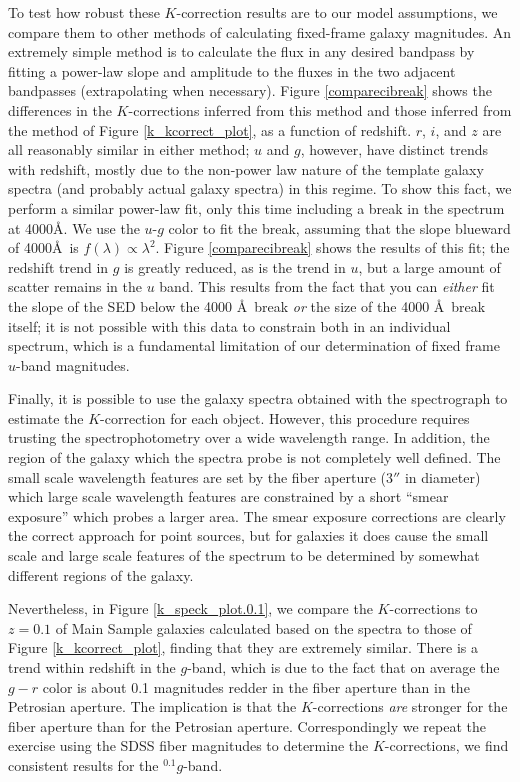 \documentclass[10pt,preprint]{aastex}
\newcommand{\band}[2]{\ensuremath{^{#1}\!{#2}}}
\begin{document}
To test how robust these $K$-correction results are to our model
assumptions, we compare them to other methods of calculating
fixed-frame galaxy magnitudes.  An extremely simple method is to
calculate the flux in any desired bandpass by fitting a power-law
slope and amplitude to the fluxes in the two adjacent bandpasses
(extrapolating when necessary). Figure \ref{comparecibreak}
shows the differences in the $K$-corrections inferred from this method
and those inferred from the method of Figure
\ref{k_kcorrect_plot}, as a function of redshift. $r$, $i$, and
$z$ are all reasonably similar in either method; $u$ and $g$, however,
have distinct trends with redshift, mostly due to the non-power law
nature of the template galaxy spectra (and probably actual galaxy
spectra) in this regime. To show this fact, we perform a similar
power-law fit, only this time including a break in the spectrum at
4000\AA. We use the $u$-$g$ color to fit the break, assuming that the
slope blueward of 4000\AA\ is $f(\lambda)\propto \lambda^{2}$.  Figure
\ref{comparecibreak} shows the results of this fit; the
redshift trend in $g$ is greatly reduced, as is the trend in $u$, but
a large amount of scatter remains in the $u$ band. This results from
the fact that you can {\it either} fit the slope of the SED below the
4000 \AA\ break {\it or} the size of the 4000 \AA\ break itself; it is
not possible with this data to constrain both in an individual
spectrum, which is a fundamental limitation of our determination of 
fixed frame $u$-band magnitudes.

Finally, it is possible to use the galaxy spectra obtained with the
spectrograph to estimate the $K$-correction for each object.  However,
this procedure requires trusting the spectrophotometry over a wide
wavelength range. In addition, the region of the galaxy which the
spectra probe is not completely well defined. The small scale
wavelength features are set by the fiber aperture ($3''$ in diameter)
which large scale wavelength features are constrained by a short
``smear exposure'' which probes a larger area. The smear exposure
corrections are clearly the correct approach for point sources, but
for galaxies it does cause the small scale and large scale features of
the spectrum to be determined by somewhat different regions of the
galaxy.

Nevertheless, in Figure \ref{k_speck_plot.0.1}, we compare the
$K$-corrections to $z=0.1$ of Main Sample galaxies calculated based on
the spectra to those of Figure \ref{k_kcorrect_plot}, finding that
they are extremely similar. There is a trend within redshift in the
$g$-band, which is due to the fact that on average the $g-r$ color is
about 0.1 magnitudes redder in the fiber aperture than in the
Petrosian aperture. The implication is that the $K$-corrections {\it
are} stronger for the fiber aperture than for the Petrosian aperture.
Correspondingly we repeat the exercise using the SDSS fiber magnitudes
to determine the $K$-corrections, we find consistent results for the
$\band{0.1}{g}$-band. 
\end{document}
